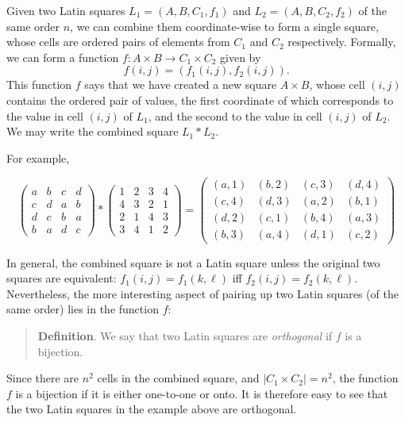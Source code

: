 \documentclass[12pt]{article}
\begin{document}

Given two Latin squares $L_1=(A,B,C_1,f_1)$ and $L_2=(A,B,C_2,f_2)$ of the same order $n$, we can combine them coordinate-wise to form a single square, whose cells are ordered pairs of elements from $C_1$ and $C_2$ respectively.  Formally, we can form a function $f:A\times B\to C_1\times C_2$ given by $$f(i,j)=(f_1(i,j),f_2(i,j)).$$
This function $f$ says that we have created a new square $A\times B$, whose cell $(i,j)$ contains the ordered pair of values, the first coordinate of which corresponds to the value in cell $(i,j)$ of $L_1$, and the second to the value in cell $(i,j)$ of $L_2$.  We may write the combined square $L_1*L_2$.

For example,

\begin{equation*}
\left(\begin{array}{cccc}
a & b & c & d\\
c & d & a &b\\
d & c & b & a\\
b & a & d & c
\end{array}\right)
*
\left(\begin{array}{cccc}
1 & 2& 3& 4\\
4 & 3 & 2 & 1\\
2 & 1 & 4 & 3\\
3 & 4 & 1 & 2
\end{array}\right)
=
\left(\begin{array}{cccc}
(a,1) & (b,2) & (c,3) & (d,4)\\
(c,4) & (d,3) & (a,2) & (b,1)\\
(d,2) & (c,1) & (b,4) & (a,3)\\
(b,3) & (a,4) & (d,1) & (c,2)
\end{array}\right)
\end{equation*}

In general, the combined square is not a Latin square unless the original two squares are equivalent: $f_1(i,j)=f_1(k,\ell)$ iff $f_2(i,j)=f_2(k,\ell)$.  Nevertheless, the more interesting aspect of pairing up two Latin squares (of the same order) lies in the function $f$:  

\begin{quote}
\textbf{Definition}.  We say that two Latin squares are \emph{orthogonal} if $f$ is a bijection.  
\end{quote}

Since there are $n^2$ cells in the combined square, and $| C_1\times C_2| = n^2$, the function $f$ is a bijection if it is either one-to-one or onto.  It is therefore easy to see that the two Latin squares in the example above are orthogonal.
\end{document}
